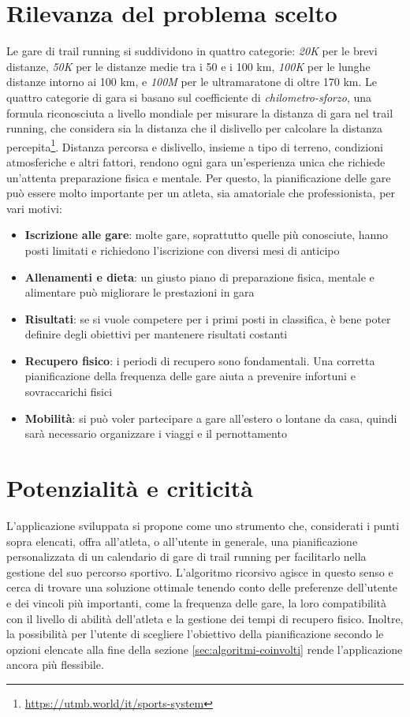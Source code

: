 \documentclass[a4paper, 12pt, oneside]{book}
\begin{document}
\section{Rilevanza del problema scelto}
Le gare di trail running si suddividono in quattro categorie: \textit{20K} per le brevi distanze, \textit{50K} per le distanze medie tra i 50 e i 100 km, \textit{100K} per le lunghe distanze intorno ai 100 km, e \textit{100M} per le ultramaratone di oltre 170 km. Le quattro categorie di gara si basano sul coefficiente di \textit{chilometro-sforzo}, una formula riconosciuta a livello mondiale per misurare la distanza di gara nel trail running, che considera sia la distanza che il dislivello per calcolare la distanza percepita\footnote{\color{blue}\url{https://utmb.world/it/sports-system}}. Distanza percorsa e dislivello, insieme a tipo di terreno, condizioni atmosferiche e altri fattori, rendono ogni gara un'esperienza unica che richiede un'attenta preparazione fisica e mentale. Per questo, la pianificazione delle gare può essere molto importante per un atleta, sia amatoriale che professionista, per vari motivi:
\begin{itemize}
    \item \textbf{Iscrizione alle gare}: molte gare, soprattutto quelle più conosciute, hanno posti limitati e richiedono l'iscrizione con diversi mesi di anticipo 
    \item \textbf{Allenamenti e dieta}: un giusto piano di preparazione fisica, mentale e alimentare può migliorare le prestazioni in gara
    \item \textbf{Risultati}: se si vuole competere per i primi posti in classifica, è bene poter definire degli obiettivi per mantenere risultati costanti
    \item \textbf{Recupero fisico}: i periodi di recupero sono fondamentali. Una corretta pianificazione della frequenza delle gare aiuta a prevenire infortuni e sovraccarichi fisici 
    \item \textbf{Mobilità}: si può voler partecipare a gare all'estero o lontane da casa, quindi sarà necessario organizzare i viaggi e il pernottamento
\end{itemize}

\section{Potenzialità e criticità}
L'applicazione sviluppata si propone come uno strumento che, considerati i punti sopra elencati, offra all'atleta, o all'utente in generale, una pianificazione personalizzata di un calendario di gare di trail running per facilitarlo nella gestione del suo percorso sportivo. L'algoritmo ricorsivo agisce in questo senso e cerca di trovare una soluzione ottimale tenendo conto delle preferenze dell'utente e dei vincoli più importanti, come la frequenza delle gare, la loro compatibilità con il livello di abilità dell'atleta e la gestione dei tempi di recupero fisico. Inoltre, la possibilità per l'utente di scegliere l'obiettivo della pianificazione secondo le opzioni elencate alla fine della sezione \ref{sec:algoritmi-coinvolti} rende l'applicazione ancora più flessibile.
\end{document}
